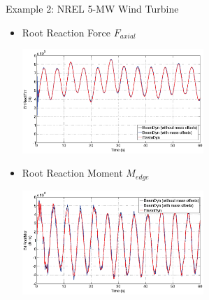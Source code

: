 \documentclass[xcolor=cmyk]{beamer}
\begin{document}
\begin{frame}{Example 2: NREL 5-MW Wind Turbine}
    \begin{itemize}
        \item
        Root Reaction Force $F_{axial}$
         \begin{center}
         \includegraphics[width=2.7in]{EPSF/B1RootFzr.eps}
         \end{center}
         \item
         Root Reaction Moment $M_{edge}$
         \begin{center}
         \includegraphics[width=2.7in]{EPSF/B1RootMxr.eps}
         \end{center}
    \end{itemize}
\end{frame}
\end{document}
